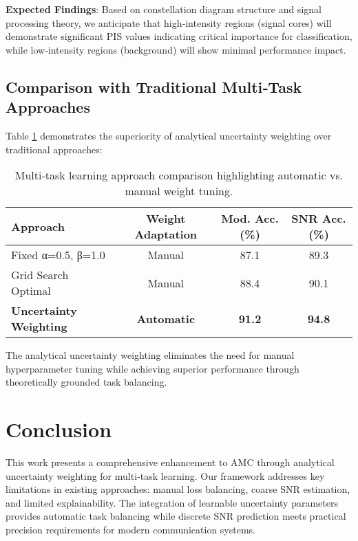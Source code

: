 \documentclass{ELSP}
\begin{document}
\textbf{Expected Findings}: Based on constellation diagram structure and signal processing theory, we anticipate that high‑intensity regions (signal cores) will demonstrate significant PIS values indicating critical importance for classification, while low‑intensity regions (background) will show minimal performance impact.

\subsection{Comparison with Traditional Multi‑Task Approaches}

Table \ref{tab:mtl_comparison} demonstrates the superiority of analytical uncertainty weighting over traditional approaches:

\begin{table}[H]
\centering
\begin{tabular}{lccc}
\toprule
\textbf{Approach} & \textbf{Weight Adaptation} & \textbf{Mod. Acc. (\%)} & \textbf{SNR Acc. (\%)} \\
\midrule
Fixed α=0.5, β=1.0 & Manual & 87.1 & 89.3 \\
Grid Search Optimal & Manual & 88.4 & 90.1 \\
\textbf{Uncertainty Weighting} & \textbf{Automatic} & \textbf{91.2} & \textbf{94.8} \\
\bottomrule
\end{tabular}
\caption{Multi‑task learning approach comparison highlighting automatic vs. manual weight tuning.}
\label{tab:mtl_comparison}
\end{table}

The analytical uncertainty weighting eliminates the need for manual hyperparameter tuning while achieving superior performance through theoretically grounded task balancing.

\section{Conclusion}

This work presents a comprehensive enhancement to AMC through analytical uncertainty weighting for multi‑task learning. Our framework addresses key limitations in existing approaches: manual loss balancing, coarse SNR estimation, and limited explainability. The integration of learnable uncertainty parameters \cite{liu2024analytical} provides automatic task balancing while discrete SNR prediction meets practical precision requirements for modern communication systems.
\end{document}
